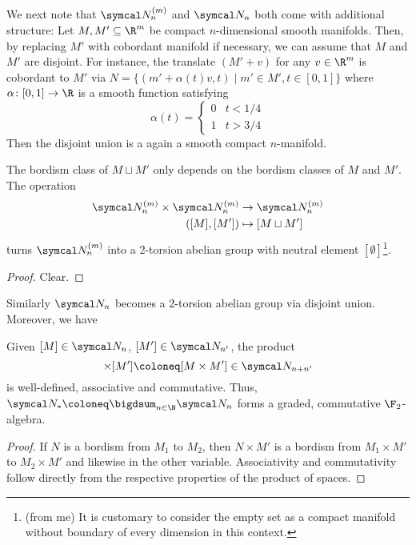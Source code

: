 We next note that $\Bord_n^{(m)}$ and $\Bord_n$ both come with additional structure:
Let $M, M' \subseteq \R^m$ be compact $n$-dimensional smooth manifolds.
Then, by replacing $M'$ with cobordant manifold if necessary, we can assume that $M$ and $M'$ are disjoint. For instance, the translate $(M' + v)$ for any $v \in \R^m$ is cobordant to $M'$ via $N = \{(m' + \alpha(t)v, t) \mid m' \in M', t \in [0, 1]\}$ where $\alpha\colon [0, 1] \to \R$ is a smooth function satisfying 
\begin{equation*}
	\alpha(t) = \begin{cases}
		0 & t < 1 / 4 \\
		1 & t > 3 / 4
	\end{cases}
\end{equation*}
Then the disjoint union is a again a smooth compact $n$-manifold.
\begin{lemma}
	The bordism class of $M \sqcup M'$ only depends on the bordism classes of $M$ and $M'$.
	The operation
	\begin{align*}
		\Bord_n^{(m)} \times \Bord_n^{(m)} &\to \Bord_n^{(m)} \\
		([M], [M']) &\mapsto [M \sqcup M']
	\end{align*}
	turns $\Bord_n^{(m)}$ into a 2-torsion abelian group with neutral element $[\emptyset]$\footnote{(from me) It is customary to consider the empty set as a compact manifold without boundary of every dimension in this context.}.
\end{lemma}
\begin{proof}
	Clear.
\end{proof}
Similarly $\Bord_n$ becomes a 2-torsion abelian group via disjoint union.
Moreover, we have
\begin{lemma}
	Given $[M] \in \Bord_n$, $[M'] \in \Bord_{n'}$, the product
	\begin{equation*}
		[M] \times [M'] \coloneq [M \times M'] \in \Bord_{n + n'}
	\end{equation*}
	is well-defined, associative and commutative.
	Thus, $\Bord_* \coloneq \bigdsum_{n \in \N} \Bord_n$ forms a graded, commutative $\F_2$-algebra.
\end{lemma}
\begin{proof}
	If $N$ is a bordism from $M_1$ to $M_2$, then $N \times M'$ is a bordism from $M_1 \times M'$ to $M_2 \times M'$ and likewise in the other variable.
	Associativity and commutativity follow directly from the respective properties of the product of spaces.
\end{proof}
